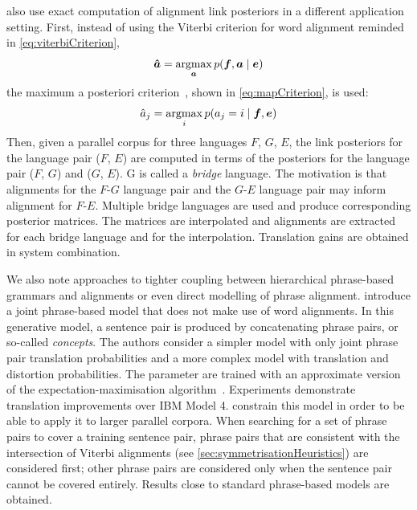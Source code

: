 \citet{kumar-och-macherey:2007:EMNLP} also use exact computation
of alignment link posteriors in a different application setting.
First, instead of using the Viterbi criterion for word alignment
reminded in \autoref{eq:viterbiCriterion},
%
\begin{equation}
  \bm{\hat{a}} = \operatorname*{argmax}_{\bm{a}} p(\bm{f}, \bm{a} \mid \bm{e})
  \label{eq:viterbiCriterion}
\end{equation}
%
the maximum a posteriori criterion~\citep{matusov-zens-ney:2004:COLING}, shown in \autoref{eq:mapCriterion}, is used:
%
\begin{equation}
  \hat{a}_j = \operatorname*{argmax}_{i} p(a_j = i \mid \bm{f}, \bm{e})
  \label{eq:mapCriterion}
\end{equation}
%
Then, given a parallel corpus for three languages $F$, $G$, $E$, the
link posteriors for the language pair ($F$, $E$) are computed
in terms of the posteriors for the language pair ($F$, $G$) and ($G$, $E$).
G is called a \emph{bridge} language. The motivation is that
alignments for the $F$-$G$ language pair and the $G$-$E$ language
pair may inform alignment for $F$-$E$. Multiple bridge languages are used
and produce corresponding posterior matrices. The matrices are interpolated
and alignments are extracted for each bridge language and for the
interpolation. Translation gains are obtained in system combination.

We also note approaches to tighter coupling between hierarchical phrase-based
grammars and alignments or even direct modelling of phrase alignment.
\citet{marcu-wong:2002:EMNLP} introduce a joint phrase-based model that
does not make use of word alignments. In this generative model, a sentence
pair is produced by concatenating phrase pairs, or so-called \emph{concepts}.
The authors consider a simpler model with only joint phrase pair translation
probabilities and a more complex model with translation and distortion
probabilities. The parameter are trained with an approximate version of the
expectation-maximisation algorithm~\citep{dempster-laird-rubin:1977:JRSS}.
Experiments demonstrate translation improvements over IBM Model 4.
\citet{birch-callisonburch-osborne-koehn:2006:WMT} constrain this model
in order to be able to apply it to larger parallel corpora. When searching for
a set of phrase pairs to cover a training sentence pair, phrase pairs that
are consistent with the intersection of Viterbi
alignments (see \autoref{sec:symmetrisationHeuristics}) are considered first; other
phrase pairs are considered only when the sentence pair cannot be covered entirely.
Results close to standard phrase-based models are obtained.


